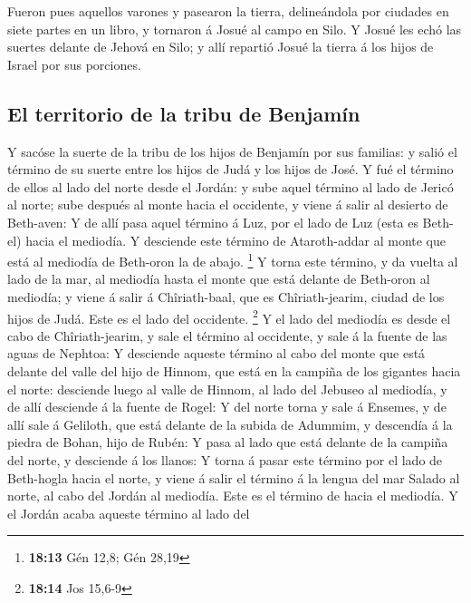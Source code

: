  Fueron pues aquellos varones y pasearon la tierra,
delineándola por ciudades en siete partes en un libro, y tornaron á
Josué al campo en Silo.  Y Josué les echó las suertes
delante de Jehová en Silo; y allí repartió Josué la tierra á los hijos
de Israel por sus porciones.

\hypertarget{el-territorio-de-la-tribu-de-benjamuxedn}{%
\subsection{El territorio de la tribu de
Benjamín}\label{el-territorio-de-la-tribu-de-benjamuxedn}}

 Y sacóse la suerte de la tribu de los hijos de Benjamín
por sus familias: y salió el término de su suerte entre los hijos de
Judá y los hijos de José.  Y fué el término de ellos al
lado del norte desde el Jordán: y sube aquel término al lado de Jericó
al norte; sube después al monte hacia el occidente, y viene á salir al
desierto de Beth-aven:  Y de allí pasa aquel término á
Luz, por el lado de Luz (esta es Beth-el) hacia el mediodía. Y desciende
este término de Ataroth-addar al monte que está al mediodía de Beth-oron
la de abajo. \footnote{\textbf{18:13} Gén 12,8; Gén 28,19}
 Y torna este término, y da vuelta al lado de la mar, al
mediodía hasta el monte que está delante de Beth-oron al mediodía; y
viene á salir á Chîriath-baal, que es Chîriath-jearim, ciudad de los
hijos de Judá. Este es el lado del occidente. \footnote{\textbf{18:14}
  Jos 15,6-9}  Y el lado del mediodía es desde el cabo de
Chîriath-jearim, y sale el término al occidente, y sale á la fuente de
las aguas de Nephtoa:  Y desciende aqueste término al
cabo del monte que está delante del valle del hijo de Hinnom, que está
en la campiña de los gigantes hacia el norte: desciende luego al valle
de Hinnom, al lado del Jebuseo al mediodía, y de allí desciende á la
fuente de Rogel:  Y del norte torna y sale á Ensemes, y
de allí sale á Geliloth, que está delante de la subida de Adummim, y
descendía á la piedra de Bohan, hijo de Rubén:  Y pasa al
lado que está delante de la campiña del norte, y desciende á los llanos:
 Y torna á pasar este término por el lado de Beth-hogla
hacia el norte, y viene á salir el término á la lengua del mar Salado al
norte, al cabo del Jordán al mediodía. Este es el término de hacia el
mediodía.  Y el Jordán acaba aqueste término al lado del
